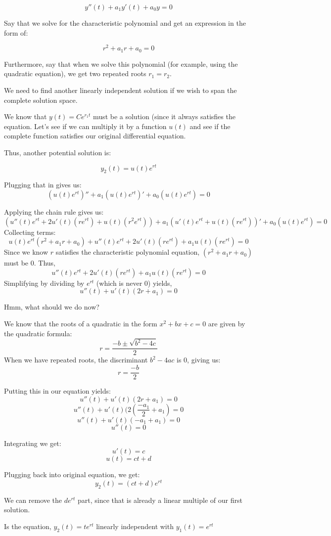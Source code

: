 \documentclass{report}
\begin{document}
$$y''(t) + a_1y'(t) + a_0y = 0$$

Say that we solve for the characteristic polynomial and get an expression in the form of:

$$r^2 + a_1r + a_0 = 0$$

Furthermore, say that when we solve this polynomial (for example, using the quadratic equation), we get two repeated roots $r_1=r_2$.

We need to find another linearly independent solution if we wish to span the complete solution space.

We know that $y(t) = Ce^{r_1t}$ must be a solution (since it always satisfies the equation. Let's see if we can multiply it by a function $u(t)$ and see if the complete function satisfies our original differential equation.

Thus, another potential solution is:

$$y_2(t) = u(t)e^{rt}$$

Plugging that in gives us:
$$(u(t)e^{rt})'' + a_1(u(t)e^{rt})' + a_0(u(t)e^{rt}) = 0$$

Applying the chain rule gives us:
$$(u''(t)e^{rt}+2u'(t)(re^{rt}) + u(t)(r^2e^{rt})) + a_1(u'(t)e^{rt} + u(t)(re^{rt}))' + a_0(u(t)e^{rt}) = 0$$
Collecting terms:
$$u(t)e^{rt}(r^2+a_1r+a_0) +u''(t)e^{rt} + 2u'(t)(re^{rt}) + a_1 u(t)(re^{rt}) = 0$$
Since we know $r$ satisfies the characteristic polynomial equation, $(r^2+a_1r+a_0)$ must be 0. Thus,
$$u''(t)e^{rt} + 2u'(t)(re^{rt}) + a_1 u(t)(re^{rt}) = 0$$
Simplifying by dividing by $e^{rt}$ (which is never 0) yields,
$$u''(t) + u'(t)(2r+a_1) = 0$$

Hmm, what should we do now?

We know that the roots of a quadratic in the form $x^2 + bx + c = 0$ are given by the quadratic formula:
$$r = \frac{-b \pm \sqrt{b^2-4c}}{2}$$
When we have repeated roots, the discriminant $b^2-4ac$ is 0, giving us:
$$r = \frac{-b}{2}$$


Putting this in our equation yields:
$$u''(t)+u'(t)(2r+a_1) = 0$$
$$u''(t)+u'(t)(2(\frac{-a_1}{2}+a_1) = 0$$
$$u''(t) + u'(t)(-a_1+a_1) = 0$$
$$u''(t) = 0$$

Integrating we get:
$$u'(t) = c$$
$$u(t) = ct + d$$

Plugging back into original equation, we get:
$$y_2(t) = (ct+d)e^{rt}$$

We can remove the $de^{rt}$ part, since that is already a linear multiple of our first solution.

Is the equation, $y_2(t) = te^{rt}$ linearly independent with $y_1(t) = e^{rt}$
\end{document}
